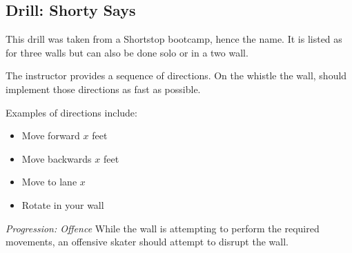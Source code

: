 \subsection*{Drill: Shorty Says}
\label{drill:three_wall/shorty_says}

This drill was taken from a Shortstop bootcamp, hence the name.
It is listed as for three walls but can also be done solo or in a two wall.


The instructor provides a sequence of directions.
On the whistle the wall, should implement those directions as fast as possible. 

Examples of directions include:

\begin{itemize}
\item Move forward $x$ feet
\item Move backwards $x$ feet
\item Move to lane $x$ 
\item Rotate in your wall
\end{itemize}



{\it Progression: Offence}
While the wall is attempting to perform the required movements, an offensive skater should attempt to disrupt the wall.  

